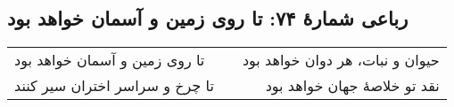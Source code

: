 \begin{center}
\section*{رباعی شمارهٔ ۷۴: تا روی زمین و آسمان خواهد بود}
\label{sec:074}
\begin{longtable}{l p{0.5cm} r}
تا روی زمین و آسمان خواهد بود
&&
حیوان و نبات، هر دوان خواهد بود
\\
تا چرخ و سراسر اختران سیر کنند
&&
نقد تو خلاصهٔ جهان خواهد بود
\\
\end{longtable}
\end{center}
